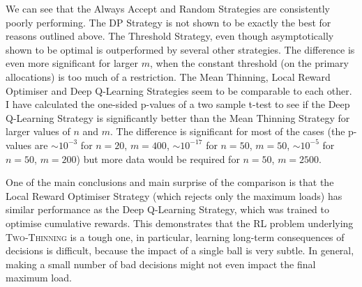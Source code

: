 We can see that the Always Accept and Random Strategies are consistently poorly performing. The DP Strategy is not shown to be exactly the best for reasons outlined above. The Threshold Strategy, even though asymptotically shown to be optimal is outperformed by several other strategies. The difference is even more significant for larger $m$, when the constant threshold (on the primary allocations) is too much of a restriction. The Mean Thinning, Local Reward Optimiser and Deep Q-Learning Strategies seem to be comparable to each other. I have calculated the one-sided p-values of a two sample t-test to see if the Deep Q-Learning Strategy is significantly better than the Mean Thinning Strategy for larger values of $n$ and $m$. The difference is significant for most of the cases (the p-values are $\sim 10^{-3}$ for $n=20$, $m=400$, $\sim 10^{-17}$ for $n=50$, $m=50$, $\sim 10^{-5}$ for $n=50$, $m=200$) but more data would be required for $n=50$, $m=2500$.  



One of the main conclusions and main surprise of the comparison is that the Local Reward Optimiser Strategy (which rejects only the maximum loads) has similar performance as the Deep Q-Learning Strategy, which was trained to optimise cumulative rewards. This demonstrates that the RL problem underlying \textsc{Two-Thinning} is a tough one, in particular, learning long-term consequences of decisions is difficult, because the impact of a single ball is very subtle. In general, making a small number of bad decisions might not even impact the final maximum load. 








